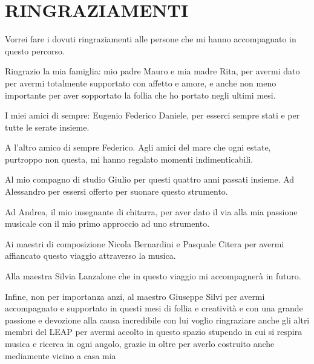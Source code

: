 
\chapter*{RINGRAZIAMENTI}

Vorrei fare i dovuti ringraziamenti alle persone che mi hanno accompagnato in questo percorso.

Ringrazio la mia famiglia: mio padre Mauro e mia madre Rita, per avermi dato per avermi totalmente supportato con affetto e amore, e anche non meno importante per aver sopportato la follia che ho portato negli ultimi mesi.

I miei amici di sempre: Eugenio Federico Daniele, per esserci sempre stati e  per tutte le serate insieme.

A l’altro amico di sempre Federico.
Agli amici del mare che ogni estate, purtroppo non questa, mi hanno regalato momenti indimenticabili.

Al mio compagno di studio Giulio per questi quattro anni passati insieme.
Ad Alessandro per essersi offerto per suonare questo strumento.

Ad Andrea, il mio insegnante di chitarra, per aver dato il via alla mia passione musicale con il mio primo approccio ad uno strumento.

Ai maestri di composizione  Nicola Bernardini e Pasquale Citera per avermi affiancato questo viaggio attraverso la musica.

Alla maestra Silvia Lanzalone che in questo viaggio  mi accompagnerà in futuro.

Infine, non per importanza anzi, al maestro Giuseppe Silvi per avermi accompagnato e supportato in questi mesi di follia e creatività e con una grande passione e devozione alla causa incredibile con lui voglio ringraziare anche gli altri membri del LEAP per avermi accolto in questo spazio stupendo in cui si respira musica e ricerca in ogni angolo, grazie in oltre per averlo costruito anche mediamente vicino a casa mia
